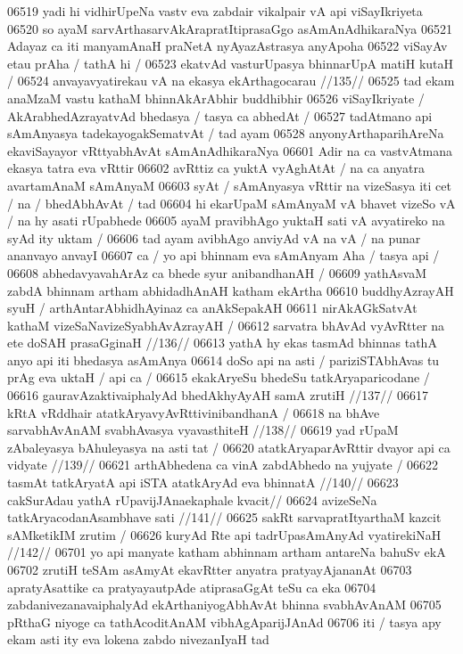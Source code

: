06519 yadi hi vidhirUpeNa vastv eva zabdair vikalpair vA api viSayIkriyeta  
06520 so ayaM sarvArthasarvAkArapratItiprasaGgo asAmAnAdhikaraNya 
06521 Adayaz ca iti manyamAnaH praNetA nyAyazAstrasya anyApoha 
06522 viSayAv etau prAha / tathA hi / 
06523 	ekatvAd vasturUpasya bhinnarUpA matiH kutaH /
06524 	anvayavyatirekau vA na ekasya ekArthagocarau //135//
06525 tad ekam anaMzaM vastu kathaM bhinnAkArAbhir buddhibhir  
06526 viSayIkriyate / AkArabhedAzrayatvAd bhedasya / tasya ca abhedAt /
06527 tadAtmano api sAmAnyasya tadekayogakSematvAt / tad ayam  
06528 anyonyArthaparihAreNa ekaviSayayor vRttyabhAvAt sAmAnAdhikaraNya
06601 Adir na ca vastvAtmana ekasya tatra eva vRttir 
06602 avRttiz ca yuktA vyAghAtAt / na ca anyatra avartamAnaM sAmAnyaM 
06603 syAt / sAmAnyasya vRttir na vizeSasya iti cet / na / bhedAbhAvAt / tad
06604 hi ekarUpaM sAmAnyaM vA bhavet vizeSo vA / na hy asati rUpabhede  
06605 ayaM pravibhAgo yuktaH sati vA avyatireko na syAd ity uktam / 
06606 tad ayam avibhAgo anviyAd vA na vA / na punar ananvayo anvayI  
06607 ca / yo api bhinnam eva sAmAnyam Aha / tasya api /
06608 	abhedavyavahArAz ca bhede syur anibandhanAH /  
06609 yathAsvaM zabdA bhinnam artham abhidadhAnAH katham ekArtha
06610 buddhyAzrayAH syuH / arthAntarAbhidhAyinaz ca anAkSepakAH 
06611 nirAkAGkSatvAt kathaM vizeSaNavizeSyabhAvAzrayAH / 
06612 	sarvatra bhAvAd vyAvRtter na ete doSAH prasaGginaH //136// 
06613 yathA hy ekas tasmAd bhinnas tathA anyo api iti bhedasya asAmAnya
06614 doSo api na asti / pariziSTAbhAvas tu prAg eva uktaH / api ca / 
06615 	ekakAryeSu bhedeSu tatkAryaparicodane / 
06616 	gauravAzaktivaiphalyAd bhedAkhyAyAH samA zrutiH //137//  
06617 	kRtA vRddhair atatkAryavyAvRttivinibandhanA /  
06618 	na bhAve sarvabhAvAnAM svabhAvasya vyavasthiteH //138//  
06619 	yad rUpaM zAbaleyasya bAhuleyasya na asti tat / 
06620 	atatkAryaparAvRttir dvayor api ca vidyate //139// 
06621 	arthAbhedena ca vinA zabdAbhedo na yujyate /  
06622 	tasmAt tatkAryatA api iSTA atatkAryAd eva bhinnatA //140//
06623 	cakSurAdau yathA rUpavijJAnaekaphale kvacit// 
06624 	avizeSeNa tatkAryacodanAsambhave sati //141// 
06625 	sakRt sarvapratItyarthaM kazcit sAMketikIM zrutim / 
06626 	kuryAd Rte api tadrUpasAmAnyAd vyatirekiNaH //142//
06701 yo api manyate katham abhinnam artham antareNa bahuSv ekA 
06702 zrutiH teSAm asAmyAt ekavRtter anyatra pratyayAjananAt 
06703 apratyAsattike ca pratyayautpAde atiprasaGgAt teSu ca eka
06704 zabdanivezanavaiphalyAd ekArthaniyogAbhAvAt bhinna svabhAvAnAM
06705 pRthaG niyoge ca tathAcoditAnAM vibhAgAparijJAnAd 
06706 iti / tasya apy ekam asti ity eva lokena zabdo nivezanIyaH tad  
